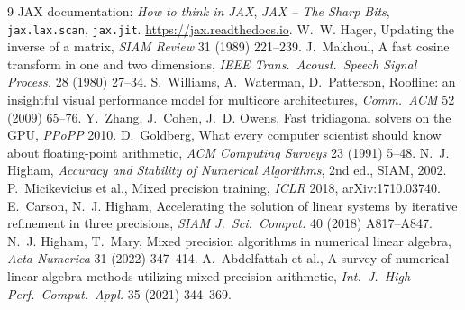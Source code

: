 \documentclass[11pt]{article}
\newcommand{\code}[1]{\texttt{#1}}
\begin{document}
\begin{thebibliography}{9}
 JAX documentation: \emph{How to think in JAX}, \emph{JAX -- The Sharp
Bits}, \code{jax.lax.scan}, \code{jax.jit}. \url{https://jax.readthedocs.io}.
 W.~W. Hager, Updating the inverse of a matrix, \emph{SIAM Review}
31 (1989) 221--239.
 J.~Makhoul, A fast cosine transform in one and two dimensions,
\emph{IEEE Trans.\ Acoust.\ Speech Signal Process.} 28 (1980) 27--34.
 S.~Williams, A.~Waterman, D.~Patterson, Roofline: an insightful
visual performance model for multicore architectures, \emph{Comm.\ ACM} 52 (2009) 65--76.
 Y.~Zhang, J.~Cohen, J.~D. Owens, Fast tridiagonal solvers on the
GPU, \emph{PPoPP} 2010.
 D.~Goldberg, What every computer scientist should know about
floating-point arithmetic, \emph{ACM Computing Surveys} 23 (1991) 5--48.
 N.~J. Higham, \emph{Accuracy and Stability of Numerical Algorithms},
2nd ed., SIAM, 2002.
 P.~Micikevicius et al., Mixed precision training,
\emph{ICLR} 2018, arXiv:1710.03740.
 E.~Carson, N.~J. Higham, Accelerating the solution of linear
systems by iterative refinement in three precisions, \emph{SIAM J.\ Sci.\ Comput.} 40
(2018) A817--A847.
 N.~J. Higham, T.~Mary, Mixed precision algorithms in numerical
linear algebra, \emph{Acta Numerica} 31 (2022) 347--414.
 A.~Abdelfattah et al., A survey of numerical linear algebra
methods utilizing mixed-precision arithmetic, \emph{Int.\ J.\ High Perf.\ Comput.\ Appl.}
35 (2021) 344--369.
\end{thebibliography}
\end{document}
